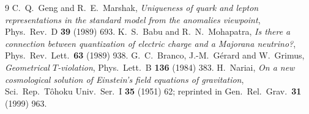 \documentclass[11pt]{article}
\begin{document}
\begin{thebibliography}{9}
 C.~Q.~Geng and R.~E.~Marshak, \emph{Uniqueness of quark and lepton representations in the standard model from the anomalies viewpoint}, Phys.\ Rev.\ D \textbf{39} (1989) 693.
 K.~S.~Babu and R.~N.~Mohapatra, \emph{Is there a connection between quantization of electric charge and a Majorana neutrino?}, Phys.\ Rev.\ Lett.\ \textbf{63} (1989) 938.
 G.~C.~Branco, J.-M.~G\'erard and W.~Grimus, \emph{Geometrical $T$-violation}, Phys.\ Lett.\ B \textbf{136} (1984) 383.
 H.~Nariai, \emph{On a new cosmological solution of Einstein's field equations of gravitation}, Sci.\ Rep.\ T\^ohoku Univ.\ Ser.\ I \textbf{35} (1951) 62; reprinted in Gen.\ Rel.\ Grav.\ \textbf{31} (1999) 963.
\end{thebibliography}



\end{document}
